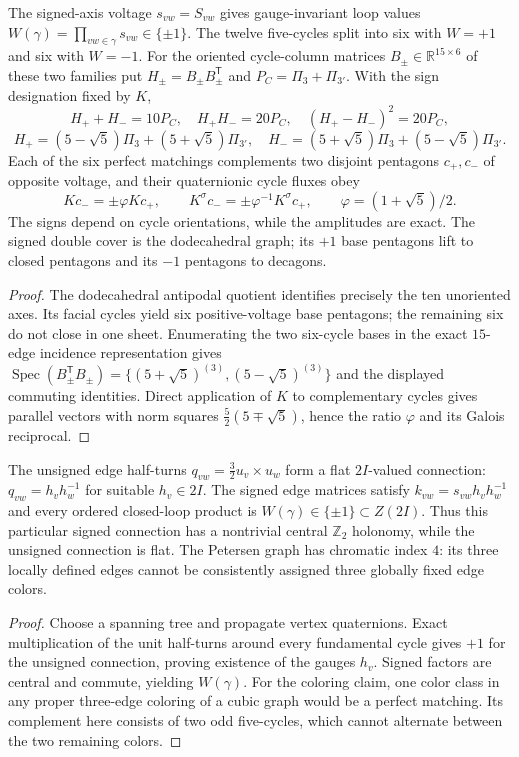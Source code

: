 \documentclass[11pt]{article}
\begin{document}
\begin{theorem}
\label{p1:thm:petersen-pentagon-reciprocity}
The signed-axis voltage $s_{vw}=S_{vw}$ gives gauge-invariant loop
values $W(\gamma)=\prod_{vw\in\gamma}s_{vw}\in\{\pm1\}$. The twelve
five-cycles split into six with $W=+1$ and six with $W=-1$.
For the oriented cycle-column matrices $B_\pm\in\mathbb R^{15\times6}$
of these two families put $H_\pm=B_\pm B_\pm^{\mathsf T}$ and
$P_C=\Pi_3+\Pi_{3'}$. With the sign designation fixed by $K$,
\[
 H_++H_-=10P_C,\quad H_+H_-=20P_C,\quad
 (H_+-H_-)^2=20P_C,
\]
\[
 H_+=(5-\sqrt5)\Pi_3+(5+\sqrt5)\Pi_{3'},\quad
 H_-=(5+\sqrt5)\Pi_3+(5-\sqrt5)\Pi_{3'}.
\]
Each of the six perfect matchings complements two disjoint pentagons
$c_+,c_-$ of opposite voltage, and their quaternionic cycle fluxes obey
\[
 Kc_-=\pm\varphi Kc_+,\qquad
 K^\sigma c_-=\pm\varphi^{-1}K^\sigma c_+,
 \qquad\varphi=(1+\sqrt5)/2.
\]
The signs depend on cycle orientations, while the amplitudes are exact.
The signed double cover is the dodecahedral graph; its $+1$ base
pentagons lift to closed pentagons and its $-1$ pentagons to decagons.
\end{theorem}
\begin{proof}
The dodecahedral antipodal quotient identifies precisely the ten
unoriented axes. Its facial cycles yield six positive-voltage base
pentagons; the remaining six do not close in one sheet. Enumerating
the two six-cycle bases in the exact $15$-edge incidence representation
gives $\operatorname{Spec}(B_\pm^{\mathsf T}B_\pm)=
\{(5+\sqrt5)^{(3)},(5-\sqrt5)^{(3)}\}$ and the displayed commuting
identities. Direct application of $K$ to complementary cycles gives
parallel vectors with norm squares $\tfrac52(5\mp\sqrt5)$, hence the
ratio $\varphi$ and its Galois reciprocal.
\end{proof}

\begin{proposition}
\label{p1:prop:petersen-binary-and-snark}
The unsigned edge half-turns $q_{vw}=\tfrac32u_v\times u_w$ form a
flat $2I$-valued connection: $q_{vw}=h_vh_w^{-1}$ for suitable
$h_v\in2I$. The signed edge matrices satisfy
$k_{vw}=s_{vw}h_vh_w^{-1}$ and every ordered closed-loop product is
$W(\gamma)\in\{\pm1\}\subset Z(2I)$. Thus this particular signed
connection has a nontrivial central $\mathbb Z_2$ holonomy, while the
unsigned connection is flat. The Petersen graph has chromatic index
$4$: its three locally defined edges cannot be consistently assigned
three globally fixed edge colors.
\end{proposition}
\begin{proof}
Choose a spanning tree and propagate vertex quaternions. Exact
multiplication of the unit half-turns around every fundamental
cycle gives $+1$ for the unsigned connection, proving existence of
the gauges $h_v$. Signed factors are central and commute, yielding
$W(\gamma)$. For the coloring claim, one color class in any proper
three-edge coloring of a cubic graph would be a perfect matching.
Its complement here consists of two odd five-cycles, which cannot
alternate between the two remaining colors.
\end{proof}
\end{document}
